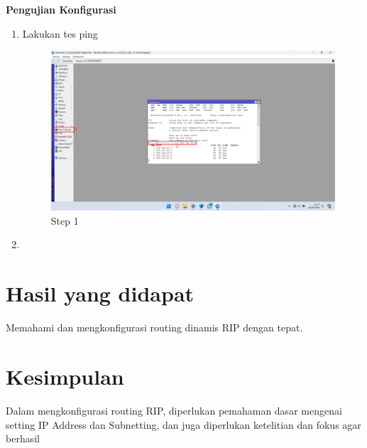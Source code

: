 \begin{center}
    \textbf{Pengujian Konfigurasi}
    \begin{enumerate}
        \item Lakukan tes ping
        \begin{figure}[H]
			\centering
			\includegraphics[width=0.8\linewidth]{P3/img/per2/pc1/Step 6.png}
			\caption{Step 1}
			\label{fig:Ping Step 1(Per.1 PC1)}
		\end{figure}
        \item 
    \end{enumerate}
\end{center}

\section{Hasil yang didapat}
Memahami dan mengkonfigurasi routing dinamis RIP dengan tepat.

\section{Kesimpulan}
Dalam mengkonfigurasi routing RIP, diperlukan pemahaman dasar mengenai setting IP Address dan Subnetting, dan juga diperlukan ketelitian dan fokus agar berhasil
